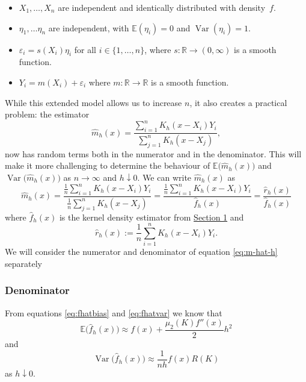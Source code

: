 \documentclass[
  a4paper,
]{article}
\providecommand{\tightlist}{%
  \setlength{\itemsep}{0pt}\setlength{\parskip}{0pt}}
\theoremstyle{definition}
\theoremstyle{definition}
\theoremstyle{definition}
\theoremstyle{definition}
\theoremstyle{remark}
\begin{document}
\begin{itemize}
\tightlist
\item
  \(X_1, \ldots, X_n\) are independent and identically distributed with
  density~\(f\).
\item
  \(\eta_1, \ldots \eta_n\) are independent, with \(\mathbb{E}(\eta_i) = 0\)
  and \(\mathop{\mathrm{Var}}(\eta_i) = 1\).
\item
  \(\varepsilon_i = s(X_i) \eta_i\) for all \(i \in \{1, \ldots, n\}\),
  where \(s\colon \mathbb{R}\to (0, \infty)\) is a smooth function.
\item
  \(Y_i = m(X_i) + \varepsilon_i\) where \(m\colon \mathbb{R}\to \mathbb{R}\) is a smooth function.
\end{itemize}

While this extended model allows us to increase \(n\), it also creates
a practical problem: the estimator
\begin{equation*}
  \hat m_h(x)
  = \frac{\sum_{i=1}^n K_h(x - X_i) Y_i}{\sum_{j=1}^n K_h(x - X_j)},
\end{equation*}
now has random terms both in the numerator and in the denominator.
This will make it more challenging to determine the behaviour
of \(\mathbb{E}\bigl( \hat m_h(x) \bigr)\) and \(\mathop{\mathrm{Var}}\bigl( \hat m_h(x) \bigr)\)
as \(n \to \infty\) and \(h \downarrow 0\). We can write \(\hat m_h(x)\) as
\begin{equation}
  \hat m_h(x)
  = \frac{\frac1n \sum_{i=1}^n K_h(x - X_i) Y_i}{\frac1n \sum_{j=1}^n K_h(x - X_j)}
  = \frac{\frac1n \sum_{i=1}^n K_h(x - X_i) Y_i}{\hat f_h(x)}
  = \frac{\hat r_h(x)}{\hat f_h(x)}  \label{eq:m-hat-h}
\end{equation}
where \(\hat f_h(x)\) is the kernel density estimator from
\protect\hyperlink{X01-KDE}{Section 1} and
\begin{equation*}
  \hat r_h(x)
  := \frac1n \sum_{i=1}^n K_h(x - X_i) Y_i.
\end{equation*}
We will consider the numerator and denominator of equation \eqref{eq:m-hat-h}
separately

\hypertarget{denominator}{%
\subsubsection*{Denominator}\label{denominator}}

From equations \eqref{eq:fhatbias} and \eqref{eq:fhatvar} we know that
\begin{equation*}
  \mathbb{E}\bigl( \hat f_h(x) \bigr)
  \approx f(x) + \frac{\mu_2(K) f''(x)}{2} h^2
\end{equation*}
and
\begin{equation*}
  \mathop{\mathrm{Var}}\bigl( \hat f_h(x) \bigr)
  \approx \frac{1}{nh} f(x) R(K)
\end{equation*}
as \(h \downarrow 0\).
\end{document}

